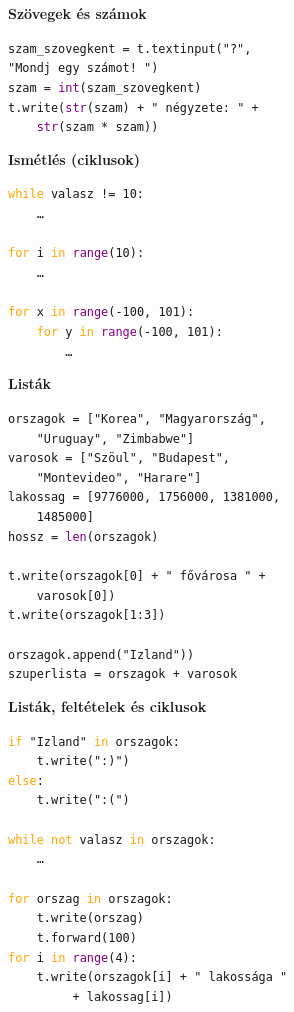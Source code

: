 \documentclass[landscape]{article}
\newcommand{\tc}[1]{\texttt{#1}}
\newcommand{\purple}[1]{\textcolor{purple}{{#1}}}
\newcommand{\orange}[1]{\textcolor{orange}{{#1}}}
\newcommand{\green}[1]{\textcolor{green!60!darkgray}{{#1}}}
\newcommand{\sor}[1]{\phantom{}\tc{{#1}}\\}
\newcommand{\szakasz}[1]{\textcolor{blue!50!darkgray}{\large{\textbf{#1}}}}
\newcommand{\pif}{\orange{if}}
\newcommand{\pelse}{\orange{else}}
\newcommand{\pwhile}{\orange{while}}
\newcommand{\pfor}{\orange{for}}
\newcommand{\pin}{\orange{in}}
\newcommand{\pnot}{\orange{not}}
\newcommand{\prange}{\purple{range}}
\newcommand{\plen}{\purple{len}}
\newcommand{\pint}{\purple{int}}
\newcommand{\pstr}{\purple{str}}
\newcommand{\pstring}[1]{\green{"{#1}"}}
\newenvironment{szoveg}{\begin{mdframed}[roundcorner=10pt,backgroundcolor=red!10!white]}{\end{mdframed}}
\newenvironment{kod}{\begin{mdframed}[roundcorner=10pt,backgroundcolor=blue!10!white]}{\end{mdframed}}
\begin{document}
\begin{multicols*}{3}
\columnbreak

\begin{szoveg}
  \szakasz{Szövegek és számok}
\end{szoveg}
\begin{kod}
  \sor{szam\_szovegkent~=~t.textinput(\pstring{?},~}
  \sor{\pstring{Mondj~egy~számot!~})}
  \sor{szam~=~\pint(szam\_szovegkent)}
  \sor{t.write(\pstr(szam)~+~\pstring{~négyzete:~}~+~}
  \sor{~~~~\pstr(szam~*~szam))}
\end{kod}

\begin{szoveg}
  \szakasz{Ismétlés (ciklusok)}
\end{szoveg}
\begin{kod}
  \sor{\pwhile~valasz~!=~10:}
  \sor{~~~~\dots}
  \sor{}
  \sor{\pfor~i~\pin~\prange(10):}
  \sor{~~~~\dots}
  \sor{}
  \sor{\pfor~x~\pin~\prange(-100,~101):}
  \sor{~~~~\pfor~y~\pin~\prange(-100,~101):}
  \sor{~~~~~~~~\dots}
\end{kod}

\begin{szoveg}
  \szakasz{Listák}
\end{szoveg}
\begin{kod}
  \sor{orszagok~=~{[}\pstring{Korea},~\pstring{Magyarország},}
  \sor{~~~~\pstring{Uruguay},~\pstring{Zimbabwe}]}
  \sor{varosok~=~{[}\pstring{Szöul},~\pstring{Budapest},}
  \sor{~~~~\pstring{Montevideo},~\pstring{Harare}]}
  \sor{lakossag~=~{[}9776000,~1756000,~1381000,}
  \sor{~~~~1485000]}
  \sor{hossz~=~\plen(orszagok)}
  \sor{}
  \sor{t.write(orszagok[0]~+~\pstring{ fővárosa }~+~}
  \sor{~~~~varosok{[}0])}
  \sor{t.write(orszagok[1:3])}
  \sor{}
  \sor{orszagok.append(\pstring{Izland}))}
  \sor{szuperlista~=~orszagok~+~varosok}
\end{kod}

\newpage

\begin{szoveg}
  \szakasz{Listák, feltételek és ciklusok}
\end{szoveg}
\begin{kod}
  \sor{\pif~\pstring{Izland}~\pin~orszagok:}
  \sor{~~~~t.write(\pstring{:)})}
  \sor{\pelse:}
  \sor{~~~~t.write(\pstring{:(})}
  \sor{}
  \sor{\pwhile~\pnot~valasz~\pin~orszagok:}
  \sor{~~~~\dots}
  \sor{}
  \sor{\pfor~orszag~\pin~orszagok:}
  \sor{~~~~t.write(orszag)}
  \sor{~~~~t.forward(100)}
  \sor{\pfor~i~\pin~\prange(4):}
  \sor{~~~~t.write(orszagok[i]~+~\pstring{ lakossága }}
  \sor{~~~~~~~~~+~lakossag[i])}
\end{kod}


\end{multicols*}
\end{document}
